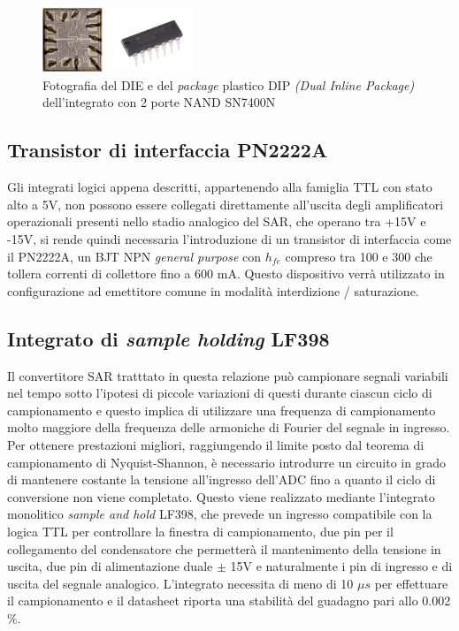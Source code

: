 \documentclass[journal]{IEEEtran}
\begin{document}
\begin{figure}[H]%
\begin{center}
\includegraphics[width=0.40\textwidth]{lab-reports/Schematics-and-graphics/SN7400N.png}
\caption{Fotografia del DIE e del \textit{package} plastico DIP \textit{(Dual Inline Package)} dell'integrato con 2 porte NAND SN7400N}
\label{fig:integrated_nand}
\end{center}
\end{figure}

\subsection{Transistor di interfaccia PN2222A}
Gli integrati logici appena descritti, appartenendo alla famiglia TTL con stato alto a 5V, non possono essere collegati direttamente all'uscita degli amplificatori operazionali presenti nello stadio analogico del SAR, che operano tra +15V e -15V, si rende quindi necessaria l'introduzione di un transistor di interfaccia come il PN2222A, un BJT NPN \textit{general purpose} con $h_{fe}$ compreso tra 100 e 300 che tollera correnti di collettore fino a 600 mA. Questo dispositivo verrà utilizzato in configurazione ad emettitore comune in modalità interdizione / saturazione.
\cite{I}


\subsection{Integrato di \textit{sample holding} LF398}
Il convertitore SAR tratttato in questa relazione può campionare segnali variabili nel tempo sotto l'ipotesi di piccole variazioni di questi durante ciascun ciclo di campionamento e questo implica di utilizzare una frequenza di campionamento molto maggiore della frequenza delle armoniche di Fourier del segnale in ingresso. Per ottenere prestazioni migliori, raggiungendo il limite posto dal teorema di campionamento di Nyquist-Shannon, è necessario introdurre un circuito in grado di mantenere costante la tensione all'ingresso dell'ADC fino a quanto il ciclo di conversione non viene completato. Questo viene realizzato mediante l'integrato monolitico \textit{sample and hold} LF398, che prevede un ingresso compatibile con la logica TTL per controllare la finestra di campionamento, due pin per il collegamento del condensatore che permetterà il mantenimento della tensione in uscita, due pin di alimentazione duale $\pm$ 15V e naturalmente i pin di ingresso e di uscita del segnale analogico. L'integrato necessita di meno di 10 $\mu s$ per effettuare il campionamento e il datasheet riporta una stabilità del guadagno pari allo 0.002 \%.
\cite{J}
\end{document}
